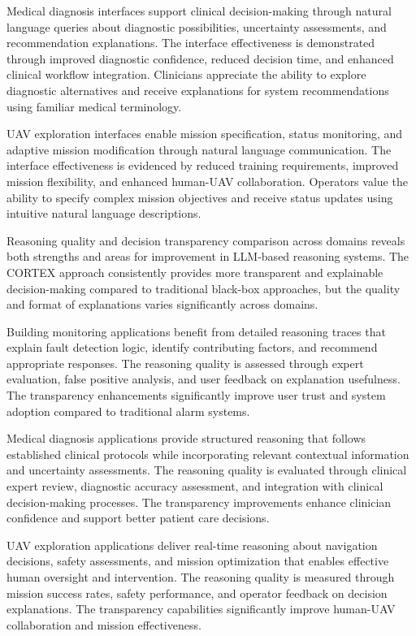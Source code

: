 Medical diagnosis interfaces support clinical decision-making through natural language queries about diagnostic possibilities, uncertainty assessments, and recommendation explanations. The interface effectiveness is demonstrated through improved diagnostic confidence, reduced decision time, and enhanced clinical workflow integration. Clinicians appreciate the ability to explore diagnostic alternatives and receive explanations for system recommendations using familiar medical terminology.

UAV exploration interfaces enable mission specification, status monitoring, and adaptive mission modification through natural language communication. The interface effectiveness is evidenced by reduced training requirements, improved mission flexibility, and enhanced human-UAV collaboration. Operators value the ability to specify complex mission objectives and receive status updates using intuitive natural language descriptions.

Reasoning quality and decision transparency comparison across domains reveals both strengths and areas for improvement in LLM-based reasoning systems. The CORTEX approach consistently provides more transparent and explainable decision-making compared to traditional black-box approaches, but the quality and format of explanations varies significantly across domains.

Building monitoring applications benefit from detailed reasoning traces that explain fault detection logic, identify contributing factors, and recommend appropriate responses. The reasoning quality is assessed through expert evaluation, false positive analysis, and user feedback on explanation usefulness. The transparency enhancements significantly improve user trust and system adoption compared to traditional alarm systems.

Medical diagnosis applications provide structured reasoning that follows established clinical protocols while incorporating relevant contextual information and uncertainty assessments. The reasoning quality is evaluated through clinical expert review, diagnostic accuracy assessment, and integration with clinical decision-making processes. The transparency improvements enhance clinician confidence and support better patient care decisions.

UAV exploration applications deliver real-time reasoning about navigation decisions, safety assessments, and mission optimization that enables effective human oversight and intervention. The reasoning quality is measured through mission success rates, safety performance, and operator feedback on decision explanations. The transparency capabilities significantly improve human-UAV collaboration and mission effectiveness.

